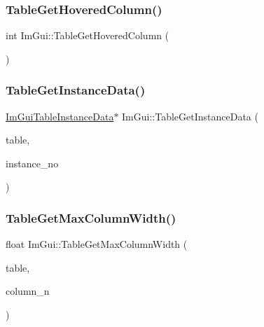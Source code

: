 \mbox{\label{namespaceImGui_a19e750505235ca98752ccc9b4befd790}} 
\subsubsection{\texorpdfstring{Table\+Get\+Hovered\+Column()}{TableGetHoveredColumn()}}
{\footnotesize\ttfamily int Im\+Gui\+::\+Table\+Get\+Hovered\+Column (\begin{DoxyParamCaption}{ }\end{DoxyParamCaption})}

\mbox{\label{namespaceImGui_a887267712291c89834a460f7e8cf2797}} 
\subsubsection{\texorpdfstring{Table\+Get\+Instance\+Data()}{TableGetInstanceData()}}
{\footnotesize\ttfamily \hyperlink{structImGuiTableInstanceData}{Im\+Gui\+Table\+Instance\+Data}$\ast$ Im\+Gui\+::\+Table\+Get\+Instance\+Data (\begin{DoxyParamCaption}\item[{\hyperlink{structImGuiTable}{Im\+Gui\+Table} $\ast$}]{table,  }\item[{int}]{instance\+\_\+no }\end{DoxyParamCaption})\hspace{0.3cm}{\ttfamily [inline]}}

\mbox{\label{namespaceImGui_acd435c37aed7c3aa11eb71a8dee09e78}} 
\subsubsection{\texorpdfstring{Table\+Get\+Max\+Column\+Width()}{TableGetMaxColumnWidth()}}
{\footnotesize\ttfamily float Im\+Gui\+::\+Table\+Get\+Max\+Column\+Width (\begin{DoxyParamCaption}\item[{const \hyperlink{structImGuiTable}{Im\+Gui\+Table} $\ast$}]{table,  }\item[{int}]{column\+\_\+n }\end{DoxyParamCaption})}

